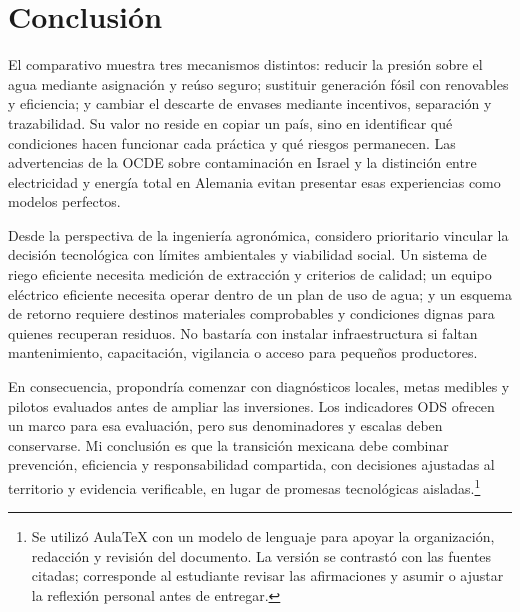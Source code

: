 \section{Conclusión}
El comparativo muestra tres mecanismos distintos: reducir la presión sobre el agua mediante asignación y reúso seguro; sustituir generación fósil con renovables y eficiencia; y cambiar el descarte de envases mediante incentivos, separación y trazabilidad. Su valor no reside en copiar un país, sino en identificar qué condiciones hacen funcionar cada práctica y qué riesgos permanecen. Las advertencias de la OCDE sobre contaminación en Israel y la distinción entre electricidad y energía total en Alemania evitan presentar esas experiencias como modelos perfectos.

Desde la perspectiva de la ingeniería agronómica, considero prioritario vincular la decisión tecnológica con límites ambientales y viabilidad social. Un sistema de riego eficiente necesita medición de extracción y criterios de calidad; un equipo eléctrico eficiente necesita operar dentro de un plan de uso de agua; y un esquema de retorno requiere destinos materiales comprobables y condiciones dignas para quienes recuperan residuos. No bastaría con instalar infraestructura si faltan mantenimiento, capacitación, vigilancia o acceso para pequeños productores.

En consecuencia, propondría comenzar con diagnósticos locales, metas medibles y pilotos evaluados antes de ampliar las inversiones. Los indicadores ODS ofrecen un marco para esa evaluación, pero sus denominadores y escalas deben conservarse. Mi conclusión es que la transición mexicana debe combinar prevención, eficiencia y responsabilidad compartida, con decisiones ajustadas al territorio y evidencia verificable, en lugar de promesas tecnológicas aisladas.\footnote{Se utilizó AulaTeX con un modelo de lenguaje para apoyar la organización, redacción y revisión del documento. La versión se contrastó con las fuentes citadas; corresponde al estudiante revisar las afirmaciones y asumir o ajustar la reflexión personal antes de entregar.}
